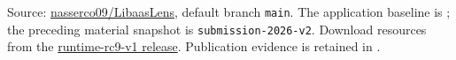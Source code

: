 Source: \href{https://github.com/nasserco09/LibaasLens}{nasserco09/LibaasLens},
default branch \texttt{main}. The application baseline is
\texttt{\ApplicationRelease}; the preceding material snapshot is
\texttt{submission-2026-v2}. Download resources from the
\href{https://github.com/nasserco09/LibaasLens/releases/tag/runtime-rc9-v1}{runtime-rc9-v1 release}.
Publication evidence is retained in
.
